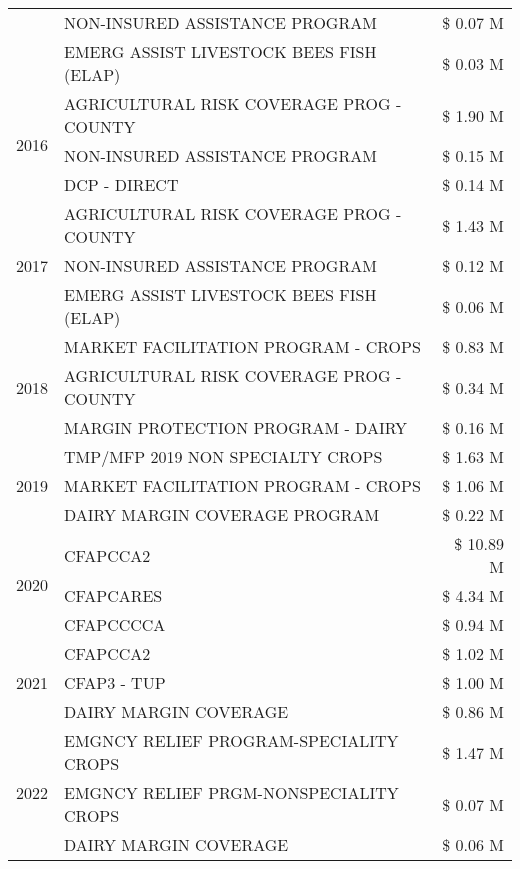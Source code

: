 \begin{tabular}{llr}
 & NON-INSURED ASSISTANCE PROGRAM & \$ 0.07 M \\
 & EMERG ASSIST LIVESTOCK BEES FISH (ELAP) & \$ 0.03 M \\
\cline{1-3}
\multirow[t]{3}{*}{2016} & AGRICULTURAL RISK COVERAGE PROG - COUNTY & \$ 1.90 M \\
 & NON-INSURED ASSISTANCE PROGRAM & \$ 0.15 M \\
 & DCP - DIRECT & \$ 0.14 M \\
\cline{1-3}
\multirow[t]{3}{*}{2017} & AGRICULTURAL RISK COVERAGE PROG - COUNTY & \$ 1.43 M \\
 & NON-INSURED ASSISTANCE PROGRAM & \$ 0.12 M \\
 & EMERG ASSIST LIVESTOCK BEES FISH (ELAP) & \$ 0.06 M \\
\cline{1-3}
\multirow[t]{3}{*}{2018} & MARKET FACILITATION PROGRAM - CROPS & \$ 0.83 M \\
 & AGRICULTURAL RISK COVERAGE PROG - COUNTY & \$ 0.34 M \\
 & MARGIN PROTECTION PROGRAM - DAIRY & \$ 0.16 M \\
\cline{1-3}
\multirow[t]{3}{*}{2019} & TMP/MFP 2019 NON SPECIALTY CROPS & \$ 1.63 M \\
 & MARKET FACILITATION PROGRAM - CROPS & \$ 1.06 M \\
 & DAIRY MARGIN COVERAGE PROGRAM & \$ 0.22 M \\
\cline{1-3}
\multirow[t]{3}{*}{2020} & CFAPCCA2 & \$ 10.89 M \\
 & CFAPCARES & \$ 4.34 M \\
 & CFAPCCCCA & \$ 0.94 M \\
\cline{1-3}
\multirow[t]{3}{*}{2021} & CFAPCCA2 & \$ 1.02 M \\
 & CFAP3 - TUP & \$ 1.00 M \\
 & DAIRY MARGIN COVERAGE & \$ 0.86 M \\
\cline{1-3}
\multirow[t]{3}{*}{2022} & EMGNCY RELIEF PROGRAM-SPECIALITY CROPS & \$ 1.47 M \\
 & EMGNCY RELIEF PRGM-NONSPECIALITY CROPS & \$ 0.07 M \\
 & DAIRY MARGIN COVERAGE & \$ 0.06 M \\
\cline{1-3}
\bottomrule
\end{tabular}
